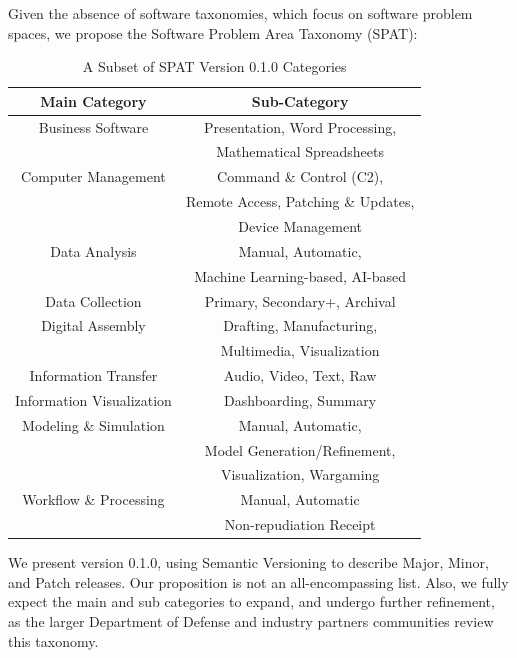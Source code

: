 \documentclass[letterpaper, 10 pt, conference]{ieeeconf}
\begin{document}
Given the absence of software taxonomies, which focus on software problem spaces, we propose the Software Problem Area Taxonomy (SPAT):

\begin{table}[h]
\begin{center}
\begin{tabular}{|c||c|}
\hline
\bf Main Category & \bf Sub-Category\\
\hline
Business Software & Presentation, Word Processing,  \\
& \newline Mathematical Spreadsheets\\
\hline
Computer Management & Command \& Control (C2),\\
& \newline Remote Access, Patching \& Updates,\\
& \newline Device Management\\
\hline
Data Analysis & Manual, Automatic, \\
& \newline  Machine Learning-based, AI-based\\
\hline
Data Collection & Primary, Secondary+, Archival\\
\hline
Digital Assembly & Drafting, Manufacturing,\\
& \newline Multimedia, Visualization \\
\hline
Information Transfer & Audio, Video, Text, Raw\\
\hline
Information Visualization & Dashboarding, Summary\\
\hline
Modeling \& Simulation & Manual, Automatic,\\
& \newline  Model Generation/Refinement,\\
& \newline  Visualization, Wargaming\\
\hline
Workflow \& Processing & Manual, Automatic\\
& \newline  Non-repudiation Receipt\\
\hline
\end{tabular}
\end{center}
\caption{A Subset of SPAT Version 0.1.0 Categories}
\label{}
\end{table}

We present version 0.1.0, using Semantic Versioning to describe Major, Minor, and Patch releases.
Our proposition is not an all-encompassing list.
Also, we fully expect the main and sub categories to expand, and undergo further refinement, as the larger Department of Defense and industry partners communities review this taxonomy.
 
\end{document}
